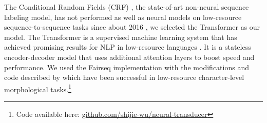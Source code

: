 The Conditional Random Fields (CRF) \citep{lafferty_conditional_2001}, the state-of-art non-neural sequence labeling model, has not performed as well as neural models on low-resource sequence-to-sequence tasks since about 2016 \citep{liu2016morphological}, we selected the Transformer \citep{vaswani_attention_2017} as our model. The Transformer is a supervised machine learning system that has achieved 
promising results for NLP in low-resource languages \citep{abbott_towards_2018,Martinus2019AFO}. It is a stateless encoder-decoder model that uses additional attention layers to boost speed and performance. 
We used the Fairseq \citep{ott2019fairseq} implementation with the modifications and code described by \citet{wu2020applying} which have been successful in low-resource character-level morphological tasks.\footnote{Code available here: \url{github.com/shijie-wu/neural-transducer}}



